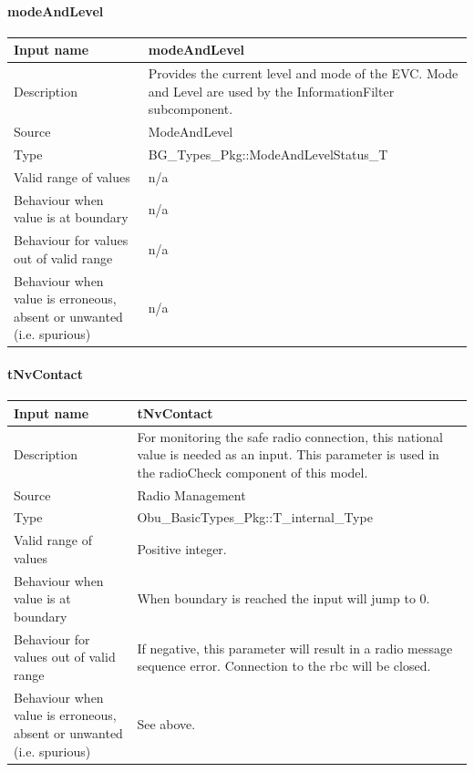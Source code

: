 \paragraph{modeAndLevel}

\begin{longtable}{p{}p{}}
\toprule
Input name				& modeAndLevel \\
\midrule
Description				& Provides the current level and mode of the EVC. Mode and Level are used by the InformationFilter subcomponent.\\
\midrule
Source					& ModeAndLevel \\ 
\midrule
Type					& BG\_Types\_Pkg::ModeAndLevelStatus\_T \\
\midrule
Valid range of values	& n/a\\
\midrule
Behaviour when value is at boundary	& n/a\\
\midrule
Behaviour for values out of valid range	& n/a\\
\midrule
Behaviour when value is erroneous, absent or unwanted (i.e. spurious) & n/a\\
\bottomrule
\end{longtable}


\paragraph{tNvContact}

\begin{longtable}{p{}p{}}
\toprule
Input name				& tNvContact \\
\midrule
Description				& For monitoring the safe radio connection, this national value is needed as an input. This parameter is used in the radioCheck component of this model. \\
\midrule
Source					& Radio Management\\ 
\midrule
Type					& Obu\_BasicTypes\_Pkg::T\_internal\_Type \\
\midrule
Valid range of values	& Positive integer. \\
\midrule
Behaviour when value is at boundary	& When boundary is reached the input will jump to 0.\\
\midrule
Behaviour for values out of valid range	& If negative, this parameter will result in a radio message sequence error. Connection to the rbc will be closed.\\
\midrule
Behaviour when value is erroneous, absent or unwanted (i.e. spurious) & See above.\\
\bottomrule
\end{longtable}

